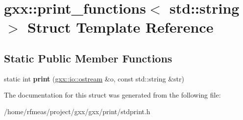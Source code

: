\hypertarget{structgxx_1_1print__functions_3_01std_1_1string_01_4}{}\section{gxx\+:\+:print\+\_\+functions$<$ std\+:\+:string $>$ Struct Template Reference}
\label{structgxx_1_1print__functions_3_01std_1_1string_01_4}
\subsection*{Static Public Member Functions}
\begin{DoxyCompactItemize}
\item 
static int {\bfseries print} (\hyperlink{classgxx_1_1io_1_1ostream}{gxx\+::io\+::ostream} \&o, const std\+::string \&str)\hypertarget{structgxx_1_1print__functions_3_01std_1_1string_01_4_aaab84b2302517d88e888a0d74e195ede}{}\label{structgxx_1_1print__functions_3_01std_1_1string_01_4_aaab84b2302517d88e888a0d74e195ede}

\end{DoxyCompactItemize}


The documentation for this struct was generated from the following file\+:\begin{DoxyCompactItemize}
\item 
/home/rfmeas/project/gxx/gxx/print/stdprint.\+h\end{DoxyCompactItemize}
